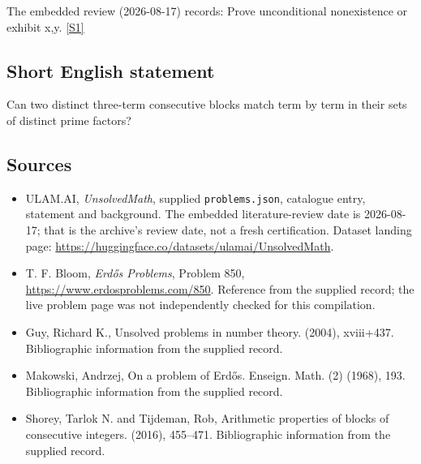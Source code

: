\documentclass[11pt,a4paper]{article}
\newcommand{\sref}[2]{\hyperlink{source:#1:#2}{[S#2]}}
\begin{document}
The embedded review (2026-08-17) records: Prove unconditional nonexistence or exhibit x,y. \sref{statement}{1}

\subsection{Short English statement}

Can two distinct three-term consecutive blocks match term by term in their sets of distinct prime factors?

\subsection{Sources}

{\small

\begin{itemize}

\item[\hypertarget{source:statement:1}{S1}] ULAM.AI, \emph{UnsolvedMath}, supplied \texttt{problems.json}, catalogue entry, statement and background. The embedded literature-review date is 2026-08-17; that is the archive’s review date, not a fresh certification. Dataset landing page: \url{https://huggingface.co/datasets/ulamai/UnsolvedMath}.

\item[\hypertarget{source:statement:2}{S2}] T. F. Bloom, \emph{Erdős Problems}, Problem 850, \url{https://www.erdosproblems.com/850}. Reference from the supplied record; the live problem page was not independently checked for this compilation.

\item[\hypertarget{source:statement:3}{S3}] Guy, Richard K., Unsolved problems in number theory. (2004), xviii+437. Bibliographic information from the supplied record.

\item[\hypertarget{source:statement:4}{S4}] Makowski, Andrzej, On a problem of {E}rd\H{o}s. Enseign. Math. (2) (1968), 193. Bibliographic information from the supplied record.

\item[\hypertarget{source:statement:5}{S5}] Shorey, Tarlok N. and Tijdeman, Rob, Arithmetic properties of blocks of consecutive integers. (2016), 455--471. Bibliographic information from the supplied record.

\end{itemize}

}

\label{end:statement}
\end{document}
